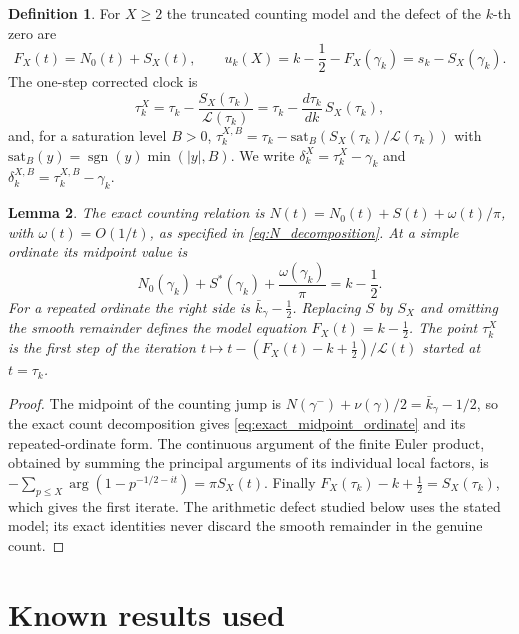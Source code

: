 \documentclass[11pt,reqno]{amsart}
\theoremstyle{plain}\newtheorem{theorem}{Theorem}[section]\newtheorem{proposition}[theorem]{Proposition}\newtheorem{lemma}[theorem]{Lemma}\newtheorem{corollary}[theorem]{Corollary}
\theoremstyle{definition}\newtheorem{hypothesis}[theorem]{Hypothesis}\newtheorem{definition}[theorem]{Definition}
\theoremstyle{remark}\newtheorem{remark}[theorem]{Remark}\newtheorem{experiment}[theorem]{Experiment}\newtheorem{question}[theorem]{Question}\newtheorem{heuristic}[theorem]{Heuristic}\newtheorem{conjecture}[theorem]{Conjecture}
\newcommand{\NO}{N_0}\newcommand{\lL}{\mathcal L}\newcommand{\IT}{\mathcal I_T}\newcommand{\R}{\mathbb R}\newcommand{\N}{\mathbb N}\newcommand{\eps}{\varepsilon}\newcommand{\sgn}{\operatorname{sgn}}
\begin{document}
\begin{definition}\label{def:LeClair_model}
For $X\ge2$ the truncated counting model and the defect of the $k$-th zero are
\begin{equation}
F_X(t)=\NO(t)+S_X(t),\qquad u_k(X)=k-\frac12-F_X(\gamma_k)=s_k-S_X(\gamma_k).
\label{eq:defect_def}
\end{equation}
The one-step corrected clock is
\begin{equation}
\tau_k^X=\tau_k-\frac{S_X(\tau_k)}{\lL(\tau_k)}=\tau_k-\frac{d\tau_k}{dk}\,S_X(\tau_k),
\label{eq:one_step_clock}
\end{equation}
and, for a saturation level $B>0$, $\tau_k^{X,B}=\tau_k-\mathrm{sat}_B(S_X(\tau_k)/\lL(\tau_k))$ with $\mathrm{sat}_B(y)=\sgn(y)\min(|y|,B)$. We write $\delta_k^X=\tau_k^X-\gamma_k$ and $\delta_k^{X,B}=\tau_k^{X,B}-\gamma_k$.
\end{definition}

\begin{lemma}\label{lem:LeClair_equation}
The exact counting relation is $N(t)=\NO(t)+S(t)+\omega(t)/\pi$, with $\omega(t)=O(1/t)$, as specified in \eqref{eq:N_decomposition}. At a simple ordinate its midpoint value is
\begin{equation}
 \NO(\gamma_k)+S^*(\gamma_k)+\frac{\omega(\gamma_k)}\pi
                  =k-\frac12.
 \label{eq:exact_midpoint_ordinate}
\end{equation}
For a repeated ordinate the right side is $\bar k_\gamma-\frac12$. Replacing $S$ by $S_X$ and omitting the smooth remainder defines the model equation $F_X(t)=k-\frac12$. The point $\tau_k^X$ is the first step of the iteration $t\mapsto t-(F_X(t)-k+\frac12)/\lL(t)$ started at $t=\tau_k$.
\end{lemma}
\begin{proof}
The midpoint of the counting jump is $N(\gamma^-)+\nu(\gamma)/2=\bar k_\gamma-1/2$, so the exact count decomposition gives \eqref{eq:exact_midpoint_ordinate} and its repeated-ordinate form. The continuous argument of the finite Euler product, obtained by summing the principal arguments of its individual local factors, is $-\sum_{p\le X}\arg(1-p^{-1/2-it})=\pi S_X(t)$. Finally $F_X(\tau_k)-k+\frac12=S_X(\tau_k)$, which gives the first iterate. The arithmetic defect studied below uses the stated model; its exact identities never discard the smooth remainder in the genuine count.
\end{proof}

\section{Known results used}
\label{sec:known_results}
\end{document}
